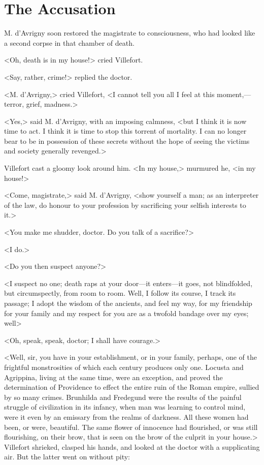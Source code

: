 \chapter{The Accusation} 
	
	\lettrine{M}{.} d'Avrigny soon restored the magistrate to consciousness, who had looked like a second corpse in that chamber of death. 

 <Oh, death is in my house!> cried Villefort. 

 <Say, rather, crime!> replied the doctor. 

 <M. d'Avrigny,> cried Villefort, <I cannot tell you all I feel at this moment,—terror, grief, madness.> 

 <Yes,> said M. d'Avrigny, with an imposing calmness, <but I think it is now time to act. I think it is time to stop this torrent of mortality. I can no longer bear to be in possession of these secrets without the hope of seeing the victims and society generally revenged.> 

 Villefort cast a gloomy look around him. <In my house,> murmured he, <in my house!> 

 <Come, magistrate,> said M. d'Avrigny, <show yourself a man; as an interpreter of the law, do honour to your profession by sacrificing your selfish interests to it.> 

 <You make me shudder, doctor. Do you talk of a sacrifice?> 

 <I do.> 

 <Do you then suspect anyone?> 

 <I suspect no one; death raps at your door—it enters—it goes, not blindfolded, but circumspectly, from room to room. Well, I follow its course, I track its passage; I adopt the wisdom of the ancients, and feel my way, for my friendship for your family and my respect for you are as a twofold bandage over my eyes; well\longdash> 

 <Oh, speak, speak, doctor; I shall have courage.> 

 <Well, sir, you have in your establishment, or in your family, perhaps, one of the frightful monstrosities of which each century produces only one. Locusta and Agrippina, living at the same time, were an exception, and proved the determination of Providence to effect the entire ruin of the Roman empire, sullied by so many crimes. Brunhilda and Fredegund were the results of the painful struggle of civilization in its infancy, when man was learning to control mind, were it even by an emissary from the realms of darkness. All these women had been, or were, beautiful. The same flower of innocence had flourished, or was still flourishing, on their brow, that is seen on the brow of the culprit in your house.>  Villefort shrieked, clasped his hands, and looked at the doctor with a supplicating air. But the latter went on without pity: 

